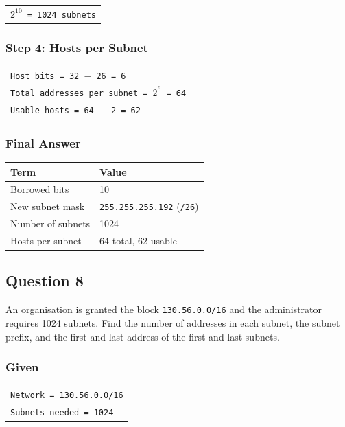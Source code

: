 \documentclass[11pt,a4paper]{article}
\begin{document}
\begin{tabularx}{\textwidth}{@{}X@{}}
\texttt{$2^{10}$ = 1024 subnets} \\
\end{tabularx}

\subsubsection*{Step 4: Hosts per Subnet}

\begin{tabularx}{\textwidth}{@{}X@{}}
\texttt{Host bits = 32 $-$ 26 = 6} \\
\texttt{Total addresses per subnet = $2^{6}$ = 64} \\
\texttt{Usable hosts = 64 $-$ 2 = 62} \\
\end{tabularx}

\subsubsection*{Final Answer}

\begin{tabularx}{\textwidth}{@{}lX@{}}
\toprule
\rowcolor{tablehead}\textbf{Term} & \textbf{Value} \\
\midrule
Borrowed bits & 10 \\
New subnet mask & \texttt{255.255.255.192} (\texttt{/26}) \\
Number of subnets & 1024 \\
Hosts per subnet & 64 total, 62 usable \\
\bottomrule
\end{tabularx}

\subsection*{Question 8}

An organisation is granted the block \texttt{130.56.0.0/16} and the administrator requires
1024 subnets. Find the number of addresses in each subnet, the subnet prefix, and the first
and last address of the first and last subnets.

\subsubsection*{Given}

\begin{tabularx}{\textwidth}{@{}X@{}}
\texttt{Network = 130.56.0.0/16} \\
\texttt{Subnets needed = 1024} \\
\end{tabularx}
\end{document}

